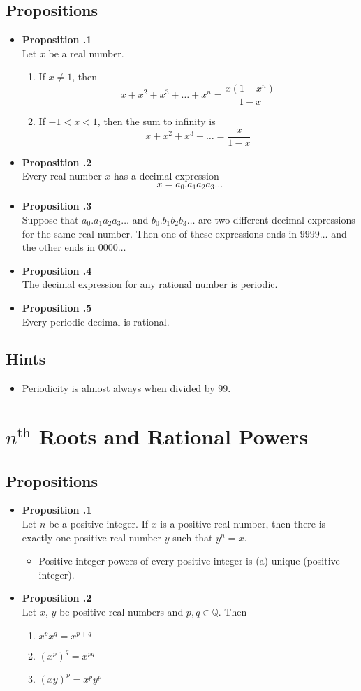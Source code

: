 \documentclass[a4paper,12pt]{article}
\newcommand{\prop}[1]{
    \item \textbf{Proposition \thesection.#1}\\
}
\begin{document}
\subsection{Propositions}
\begin{itemize}
    \prop 1
    Let $x$ be a real number.
    \begin{enumerate}
        \item If $x \not= 1$, then 
            $$ x + x^2 + x^3 + \ldots + x^n = \frac{x(1-x^n)}{1-x} $$
        \item If $-1 < x < 1$, then the sum to infinity is
            $$ x + x^2 + x^3 + \ldots = \frac{x}{1-x}$$
    \end{enumerate}
    
    \prop 2
    Every real number $x$ has a decimal expression
        $$ x = a_0.a_1a_2a_3\ldots $$
        
    \prop 3
    Suppose that $a_0.a_1a_2a_3\ldots$ and $b_0.b_1b_2b_3\ldots$ are two different decimal
    expressions for the same real number. Then one of these expressions ends in $9999\ldots$
    and the other ends in $0000\ldots$
    
    \prop 4
    The decimal expression for any rational number is periodic.
    
    \prop 5
    Every periodic decimal is rational.
\end{itemize}

\subsection{Hints}
\begin{itemize}
    \item Periodicity is almost always when divided by 99.
\end{itemize}


\section{$n^\text{th}$ Roots and Rational Powers}
\subsection{Propositions}
\begin{itemize}
    \prop 1
    Let $n$ be a positive integer. If $x$ is a positive real number, then there is exactly one positive real number $y$ such that $y^n = x$.
    \begin{itemize}
        \item Positive integer powers of every positive integer is (a) unique (positive integer).
    \end{itemize}
    
    \prop 2
    Let $x$, $y$ be positive real numbers and $p, q \in \mathbb{Q}$. Then
    \begin{enumerate}
        \item $x^px^q = x^{p+q}$
        \item $(x^p)^q = x^{pq}$
        \item $(xy)^p = x^py^p$
    \end{enumerate}
\end{itemize}
\end{document}
